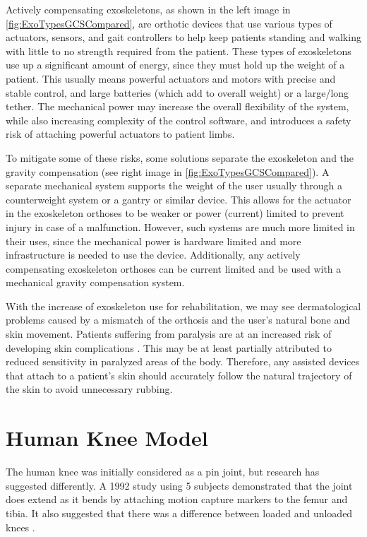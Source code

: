 Actively compensating exoskeletons, as shown in the left image in \autoref{fig:ExoTypesGCSCompared}, are orthotic devices that use various types of actuators, sensors, and gait controllers to help keep patients standing and walking with little to no strength required from the patient. These types of exoskeletons use up a significant amount of energy, since they must hold up the weight of a patient. This usually means powerful actuators and motors with precise and stable control, and large batteries (which add to overall weight) or a large/long tether. The mechanical power may increase the overall flexibility of the system, while also increasing complexity of the control software, and introduces a safety risk of attaching powerful actuators to patient limbs.

To mitigate some of these risks, some solutions separate the exoskeleton and the gravity compensation (see right image in \autoref{fig:ExoTypesGCSCompared}). A separate mechanical system supports the weight of the user usually through a counterweight system or a gantry or similar device. This allows for the actuator in the exoskeleton orthoses to be weaker or power (current) limited to prevent injury in case of a malfunction. However, such systems are much more limited in their uses, since the mechanical power is hardware limited and more infrastructure is needed to use the device. Additionally, any actively compensating exoskeleton orthoses can be current limited and be used with a mechanical gravity compensation system. 

With the increase of exoskeleton use for rehabilitation, we may see dermatological problems caused by a mismatch of the orthosis and the user's natural bone and skin movement. Patients suffering from paralysis are at an increased risk of developing skin complications \cite{DermatologicalIssuesParalysis}. This may be at least partially attributed to reduced sensitivity in paralyzed areas of the body. Therefore, any assisted devices that attach to a patient's skin should accurately follow the natural trajectory of the skin to avoid unnecessary rubbing.

\section{Human Knee Model}
\label{sec:KneeModel}

The human knee was initially considered as a pin joint, but research has suggested differently. A 1992 study using 5 subjects demonstrated that the joint does extend as it bends by attaching motion capture markers to the femur and tibia. It also suggested that there was a difference between loaded and unloaded knees \cite{3DKinKneeJointOldStabby}. 

